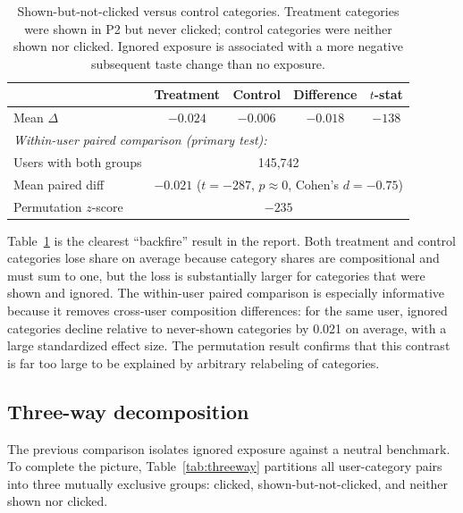 \documentclass[11pt]{article}
\begin{document}
\begin{table}[ht]
\centering
\caption{Shown-but-not-clicked versus control categories. Treatment categories were shown in P2 but never clicked; control categories were neither shown nor clicked. Ignored exposure is associated with a more negative subsequent taste change than no exposure.}
\label{tab:backfire}
\begin{tabular}{lcccc}
\toprule
 & Treatment & Control & Difference & $t$-stat \\
\midrule
Mean $\Delta$ & $-0.024$ & $-0.006$ & $-0.018$ & $-138$ \\
\midrule
\multicolumn{5}{l}{\textit{Within-user paired comparison (primary test):}} \\
Users with both groups & \multicolumn{4}{c}{145,742} \\
Mean paired diff & \multicolumn{4}{c}{$-0.021$ ($t = -287$, $p \approx 0$, Cohen's $d = -0.75$)} \\
Permutation $z$-score & \multicolumn{4}{c}{$-235$} \\
\bottomrule
\end{tabular}
\end{table}
\FloatBarrier

Table~\ref{tab:backfire} is the clearest ``backfire'' result in the report. Both treatment and control categories lose share on average because category shares are compositional and must sum to one, but the loss is substantially larger for categories that were shown and ignored. The within-user paired comparison is especially informative because it removes cross-user composition differences: for the same user, ignored categories decline relative to never-shown categories by 0.021 on average, with a large standardized effect size. The permutation result confirms that this contrast is far too large to be explained by arbitrary relabeling of categories.

\subsection{Three-way decomposition}

The previous comparison isolates ignored exposure against a neutral benchmark. To complete the picture, Table~\ref{tab:threeway} partitions all user-category pairs into three mutually exclusive groups: clicked, shown-but-not-clicked, and neither shown nor clicked.
\end{document}
